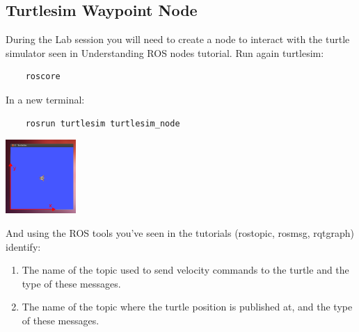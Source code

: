 \documentclass[a4paper,10pt]{article}
\begin{document}
\subsection{Turtlesim Waypoint Node}
During the Lab session you will need to create a node to interact with the turtle simulator seen in Understanding ROS nodes tutorial.
Run again turtlesim:
\begin{verbatim}
    roscore
\end{verbatim}
\noindent
In a new terminal:
\begin{verbatim}
    rosrun turtlesim turtlesim_node
\end{verbatim}

\begin{center}
    \includegraphics[width=0.2\textwidth]{pict/lab0}
    \label{sim}
\end{center}

\noindent
And using the ROS tools you’ve seen in the tutorials (rostopic, rosmsg, rqt{\textunderscore}graph) identify:
\begin{enumerate}
    \item The name of the topic used to send velocity commands to the turtle and the type of these messages.
    \item The name of the topic where the turtle position is published at, and the type of these messages.
\end{enumerate}
\end{document}
